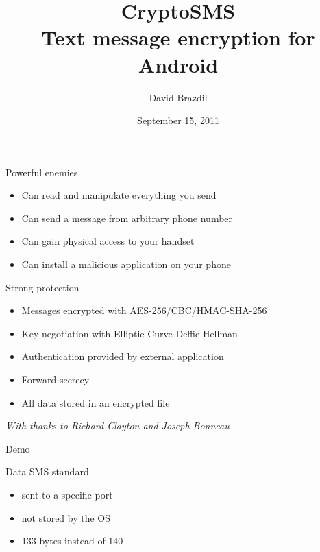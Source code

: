 \documentclass{beamer}
\title[CryptoSMS]{CryptoSMS\\Text message encryption for Android}
\author{David Brazdil}
\institute{University of Cambridge}
\date{September 15, 2011}
\begin{document}
%

\begin{frame}
	\titlepage
\end{frame}


\begin{frame}{Powerful enemies}
	\begin{itemize}
		\item{Can read and manipulate everything you send}
		\item{Can send a message from arbitrary phone number}
		\item{Can gain physical access to your handset}
		\item{Can install a malicious application on your phone}
	\end{itemize}
\end{frame}

\begin{frame}{Strong protection}
	\vfill
	\begin{itemize}
		\item{Messages encrypted with AES-256/CBC/HMAC-SHA-256}
		\item{Key negotiation with Elliptic Curve Deffie-Hellman}
		\item{Authentication provided by external application}
		\item{Forward secrecy}
		\item{All data stored in an encrypted file}
	\end{itemize}
	\vfill
	\begin{flushright}
	\emph{With thanks to Richard Clayton and Joseph Bonneau}
	\end{flushright}
\end{frame}


\begin{frame}{Demo}
\end{frame}


\begin{frame}{Data SMS standard}
	\begin{itemize}
		\item{sent to a specific port}
		\item{not stored by the OS}
		\item{133 bytes instead of 140}
	\end{itemize}
\end{frame}
\end{document}
